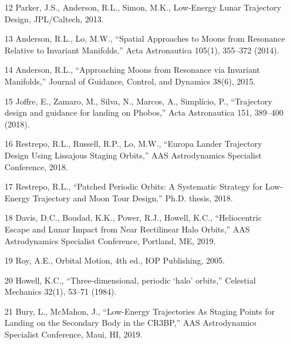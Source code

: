 \documentclass[12pt]{article}
\begin{document}
\begin{enumerate}
\item [12] Parker, J.S., Anderson, R.L., Simon, M.K., Low-Energy Lunar Trajectory Design, JPL/Caltech, 2013.
\item [13] Anderson, R.L., Lo, M.W., ``Spatial Approaches to Moons from Resonance Relative to Invariant Manifolds,'' Acta Astronautica 105(1), 355--372 (2014).
\item [14] Anderson, R.L., ``Approaching Moons from Resonance via Invariant Manifolds,'' Journal of Guidance, Control, and Dynamics 38(6), 2015.
\item [15] Joffre, E., Zamaro, M., Silva, N., Marcos, A., Simplício, P., ``Trajectory design and guidance for landing on Phobos,'' Acta Astronautica 151, 389--400 (2018).
\item [16] Restrepo, R.L., Russell, R.P., Lo, M.W., ``Europa Lander Trajectory Design Using Lissajous Staging Orbits,'' AAS Astrodynamics Specialist Conference, 2018.
\item [17] Restrepo, R.L., ``Patched Periodic Orbits: A Systematic Strategy for Low-Energy Trajectory and Moon Tour Design,'' Ph.D. thesis, 2018.
\item [18] Davis, D.C., Boudad, K.K., Power, R.J., Howell, K.C., ``Heliocentric Escape and Lunar Impact from Near Rectilinear Halo Orbits,'' AAS Astrodynamics Specialist Conference, Portland, ME, 2019.
\item [19] Roy, A.E., Orbital Motion, 4th ed., IOP Publishing, 2005.
\item [20] Howell, K.C., ``Three-dimensional, periodic ‘halo’ orbits,'' Celestial Mechanics 32(1), 53--71 (1984).
\item [21] Bury, L., McMahon, J., ``Low-Energy Trajectories As Staging Points for Landing on the Secondary Body in the CR3BP,'' AAS Astrodynamics Specialist Conference, Maui, HI, 2019.
\end{enumerate}
\end{document}
